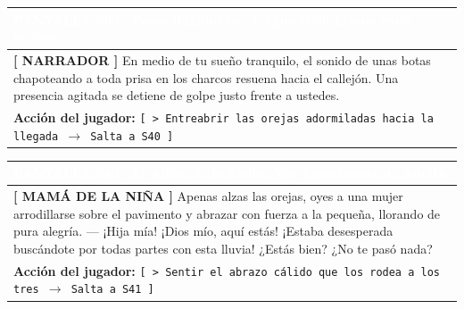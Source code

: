 \documentclass[11pt, a4paper]{article}
\begin{document}
\noindent
\begin{tabularx}{\textwidth}{|X|}
\hline
\rowcolor{colorExito}
\textbf{\textcolor{white}{PANTALLA S39 $\cdot$ Pasos Rápidos en el Agua}} \hfill \small\textcolor{white}{Oído Lejano entre Sueños} \\ \hline
\rowcolor{colorTextoBox}
\textbf{\textcolor{colorEmisor}{[ NARRADOR ]}} \vspace{0.2em}\newline
En medio de tu sueño tranquilo, el sonido de unas botas chapoteando a toda prisa en los charcos resuena hacia el callejón. Una presencia agitada se detiene de golpe justo frente a ustedes. \\ \hline
\rowcolor{colorBotonBox}
\textbf{Acción del jugador:} \newline
\texttt{[ > Entreabrir las orejas adormiladas hacia la llegada $\rightarrow$ Salta a S40 ]} \\ \hline
\end{tabularx}

\vspace{1em}

\noindent
\begin{tabularx}{\textwidth}{|X|}
\hline
\rowcolor{colorExito}
\textbf{\textcolor{white}{PANTALLA S40 $\cdot$ El Alivio de la Madre}} \hfill \small\textcolor{white}{Voz Emocionada de Adulta} \\ \hline
\rowcolor{colorTextoBox}
\textbf{\textcolor{colorEmisor}{[ MAMÁ DE LA NIÑA ]}} \vspace{0.2em}\newline
Apenas alzas las orejas, oyes a una mujer arrodillarse sobre el pavimento y abrazar con fuerza a la pequeña, llorando de pura alegría. \newline
--- ¡Hija mía! ¡Dios mío, aquí estás! ¡Estaba desesperada buscándote por todas partes con esta lluvia! ¿Estás bien? ¿No te pasó nada? \\ \hline
\rowcolor{colorBotonBox}
\textbf{Acción del jugador:} \newline
\texttt{[ > Sentir el abrazo cálido que los rodea a los tres $\rightarrow$ Salta a S41 ]} \\ \hline
\end{tabularx}

\newpage
\end{document}
